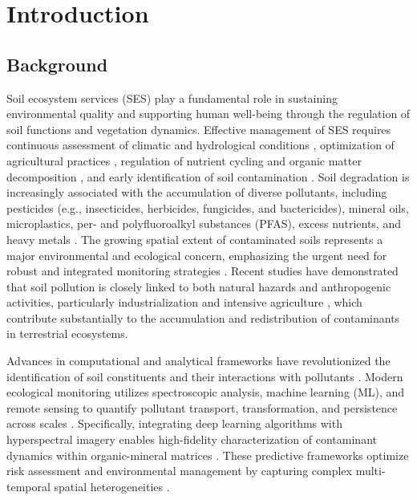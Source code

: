\documentclass[sn-mathphys-num]{sn-jnl}
\begin{document}
\section{Introduction}\label{sec1}

\subsection{Background}\label{sec1.1}

Soil ecosystem services (SES) play a fundamental role in sustaining
environmental quality and supporting human well-being through the regulation
of soil functions and vegetation dynamics. Effective management of SES
requires continuous assessment of climatic and hydrological conditions
\cite{Lal2020,Robinson2014}, optimization of agricultural practices
\cite{Hepperly2009,Rahman2014}, regulation of nutrient cycling and organic
matter decomposition \cite{Atoloye2024,Ma2024,Vishwanath2025}, and early
identification of soil contamination
\cite{Pan2019,Fan2025,Lemenkova2025b,Proshad2025}. Soil degradation is
increasingly associated with the accumulation of diverse pollutants,
including pesticides (e.g., insecticides, herbicides, fungicides, and
bactericides), mineral oils, microplastics, per- and polyfluoroalkyl
substances (PFAS), excess nutrients, and heavy metals
\cite{Shen2024,Guan2024,Baghaie2020,Luo2017}. The growing spatial extent of
contaminated soils represents a major environmental and ecological concern,
emphasizing the urgent need for robust and integrated monitoring strategies
\cite{Liu2020,Zhang2021,Lemenkova2025d}. Recent studies have demonstrated
that soil pollution is closely linked to both natural hazards and
anthropogenic activities, particularly industrialization
\cite{Rosskopfova2012,Guo2025,Zhang2022} and intensive agriculture
\cite{Hepperly2009,Rahman2014,Pan2019}, which contribute substantially to the
accumulation and redistribution of contaminants in terrestrial ecosystems.

Advances in computational and analytical frameworks have revolutionized the
identification of soil constituents and their interactions with pollutants
\cite{Liu2020,Zhang2021}. Modern ecological monitoring utilizes spectroscopic
analysis, machine learning (ML), and remote sensing to quantify pollutant
transport, transformation, and persistence across scales
\cite{Fan2025,Lemenkova2025d}. Specifically, integrating deep learning
algorithms with hyperspectral imagery enables high-fidelity characterization
of contaminant dynamics within organic-mineral matrices \cite{Xu2026,Li2023}.
These predictive frameworks optimize risk assessment and environmental
management by capturing complex multi-temporal spatial heterogeneities
\cite{Proshad2025,Feng2024}.
\end{document}
